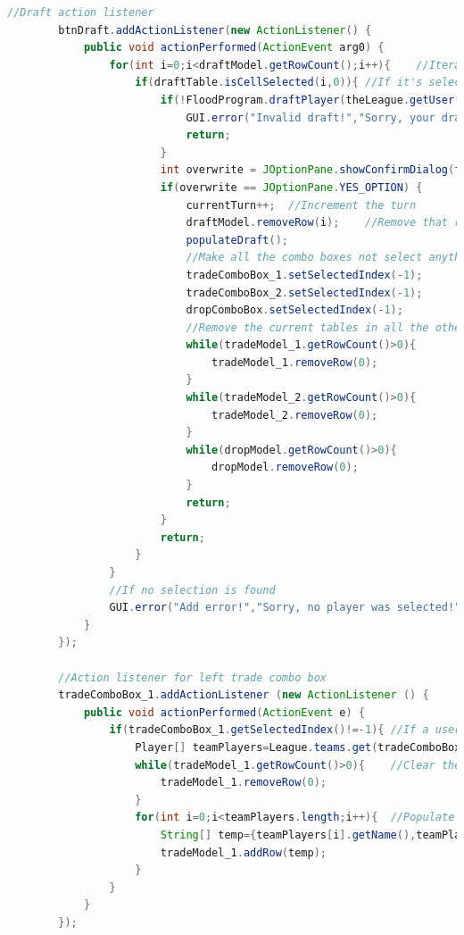 \documentclass[12pt]{report}
\begin{document}
\begin{singlespace}
\begin{lstlisting}[language=Java,label=some-code,caption={GUI.java}]
		//Draft action listener
		btnDraft.addActionListener(new ActionListener() {
			public void actionPerformed(ActionEvent arg0) {
				for(int i=0;i<draftModel.getRowCount();i++){	//Iterate through table entries
					if(draftTable.isCellSelected(i,0)){	//If it's selected
						if(!FloodProgram.draftPlayer(theLeague.getUser(pick),League.athletes.get(draftModel.getValueAt(i,0)))){	//If the draft isn't successful
							GUI.error("Invalid draft!","Sorry, your draft violates rules of the league.");
							return;
						}
						int overwrite = JOptionPane.showConfirmDialog(frmFloodFantasyLeague, "Are you sure you want to draft: " + League.athletes.get(draftModel.getValueAt(i,0)).getName());
		                if(overwrite == JOptionPane.YES_OPTION) {
							currentTurn++;	//Increment the turn
							draftModel.removeRow(i);	//Remove that row from the draft table
							populateDraft();
							//Make all the combo boxes not select anything
							tradeComboBox_1.setSelectedIndex(-1);
							tradeComboBox_2.setSelectedIndex(-1);
							dropComboBox.setSelectedIndex(-1);
							//Remove the current tables in all the other tabs so that they are up to date
							while(tradeModel_1.getRowCount()>0){
					    		tradeModel_1.removeRow(0);
					    	}
							while(tradeModel_2.getRowCount()>0){
					    		tradeModel_2.removeRow(0);
					    	}
							while(dropModel.getRowCount()>0){
					    		dropModel.removeRow(0);
					    	}
							return;
		                }
		                return;
					}
				}
				//If no selection is found
				GUI.error("Add error!","Sorry, no player was selected!");
			}
		});
		
		//Action listener for left trade combo box
		tradeComboBox_1.addActionListener (new ActionListener () {
		    public void actionPerformed(ActionEvent e) {
		    	if(tradeComboBox_1.getSelectedIndex()!=-1){	//If a user is selected
			    	Player[] teamPlayers=League.teams.get(tradeComboBox_1.getSelectedItem()).getPlayers();	//Get the players the user has
			    	while(tradeModel_1.getRowCount()>0){	//Clear the current table
			    		tradeModel_1.removeRow(0);
			    	}
			    	for(int i=0;i<teamPlayers.length;i++){	//Populate the table with the new data
			    		String[] temp={teamPlayers[i].getName(),teamPlayers[i].getPosition(),Float.toString(teamPlayers[i].getPoints())};	//Initialize the row
			    		tradeModel_1.addRow(temp);
			    	}
		    	}
		    }
		});
		

\end{lstlisting}
\end{singlespace}
\end{document}
